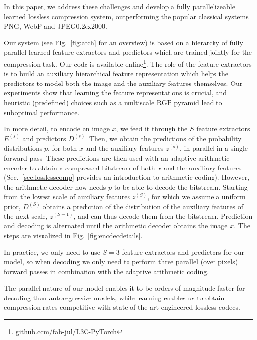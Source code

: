 \documentclass[10pt,twocolumn,letterpaper]{article}
\newcommand{\jpegk}{JPEG\kern0.2ex2000\xspace}
\begin{document}
In this paper, we address these challenges and develop a fully parallelizeable learned lossless compression system, outperforming the popular classical systems PNG, WebP and \jpegk.


Our system (see Fig.~\ref{fig:arch} for an overview) is based on a hierarchy of fully parallel learned feature extractors and predictors which are trained jointly for the compression task. Our code is available online\footnote{\label{fn:github}\url{github.com/fab-jul/L3C-PyTorch}}. The role of the feature extractors is to build an auxiliary hierarchical feature representation which helps the predictors to model both the image and the auxiliary features themselves. Our experiments show that learning the feature representations is crucial, and heuristic (predefined) choices such as a multiscale RGB pyramid lead to suboptimal performance.

In more detail, to encode an image $x$, we feed it through the $S$ feature extractors $E^{(s)}$ and predictors $D^{(s)}$. Then, we obtain the predictions of the probability distributions $p$, for both $x$ and the auxiliary features $z^{(s)}$, in parallel in a single forward pass. These predictions are then used with an adaptive arithmetic encoder to obtain a compressed bitstream of both $x$ and the auxiliary features (Sec.~\ref{sec:losslesscomp} provides an introduction to arithmetic coding). However, the arithmetic decoder now needs $p$ to be able to decode the bitstream. Starting from the lowest scale of auxiliary features $z^{(S)}$, for which we assume a uniform prior, $D^{(S)}$ obtains a prediction of the distribution of the auxiliary features of the next scale, $z^{(S-1)}$, and can thus decode them from the bitstream. Prediction and decoding is alternated until the arithmetic decoder obtains the image $x$. 
The steps are visualized in Fig.~\ref{fig:encdecdetails}.

In practice, we only need to use $S=3$ feature extractors and predictors for our model, so when decoding we only need to perform three parallel (over pixels) forward passes in combination with the adaptive arithmetic coding.

The parallel nature of our model enables it to be orders of magnitude faster for decoding than autoregressive models, while learning enables us to obtain compression rates competitive with state-of-the-art engineered lossless codecs.
\end{document}
